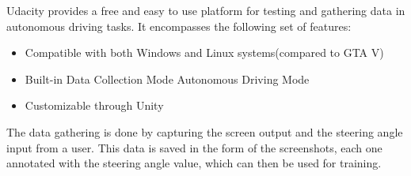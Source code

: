 Udacity provides a free and easy to use platform for testing and gathering data in autonomous driving tasks.
It encompasses the following set of features:
\begin{itemize}	
	\item Compatible with both Windows and Linux systems(compared to GTA V)
	\item Built-in
		\subitem Data Collection Mode
		\subitem Autonomous Driving Mode
	\item Customizable through Unity
\end{itemize}
The data gathering is done by capturing the screen output and the steering angle input from a user. This data is saved in the form of the screenshots, each one annotated with the steering angle value, which can then be used for training.